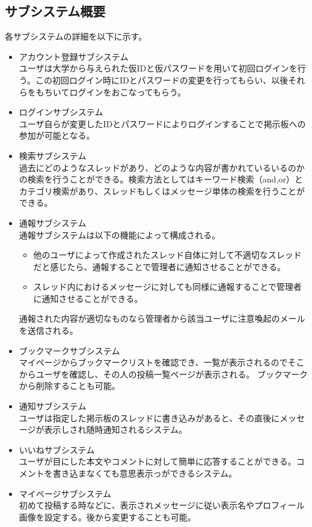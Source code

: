 \documentclass[a4j]{jarticle}
\begin{document}
\subsection{サブシステム概要}
各サブシステムの詳細を以下に示す。
\begin{itemize}
\item アカウント登録サブシステム\\
ユーザは大学から与えられた仮IDと仮パスワードを用いて初回ログインを行う。この初回ログイン時にIDとパスワードの変更を行ってもらい、以後それらをもちいてログインをおこなってもらう。
\item ログインサブシステム\\
ユーザ自らが変更したIDとパスワードによりログインすることで掲示板への参加が可能となる。
\item 検索サブシステム\\
過去にどのようなスレッドがあり、どのような内容が書かれているいるのかの検索を行うことができる。検索方法としてはキーワード検索（and,or）とカテゴリ検索があり、スレッドもしくはメッセージ単体の検索を行うことができる。
\item 通報サブシステム\\
通報サブシステムは以下の機能によって構成される。
\begin{itemize}
\item 他のユーザによって作成されたスレッド自体に対して不適切なスレッドだと感じたら、通報することで管理者に通知させることができる。
\item スレッド内におけるメッセージに対しても同様に通報することで管理者に通知させることができる。\\
\end{itemize}
通報された内容が適切なものなら管理者から該当ユーザに注意喚起のメールを送信される。
\item ブックマークサブシステム\\
マイページからブックマークリストを確認でき、一覧が表示されるのでそこからユーザを確認し、その人の投稿一覧ページが表示される。
ブックマークから削除することも可能。
\item 通知サブシステム\\
ユーザは指定した掲示板のスレッドに書き込みがあると、その直後にメッセージが表示しされ随時通知されるシステム。
\item いいねサブシステム\\
ユーザが目にした本文やコメントに対して簡単に応答することができる。コメントを書き込まなくても意思表示っができるシステム。
\item マイページサブシステム\\
初めて投稿する時などに、表示されメッセージに従い表示名やプロフィール画像を設定する。後から変更することも可能。
\end{itemize}
\end{document}
